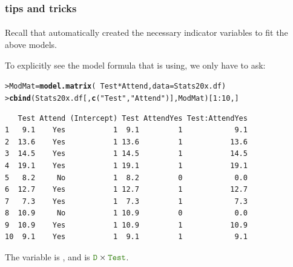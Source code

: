 \documentclass{beamer}\usepackage[]{graphicx}\usepackage[]{xcolor}
\makeatletter
\newcommand{\hlnum}[1]{\textcolor[rgb]{0.686,0.059,0.569}{#1}}%
\newcommand{\hlstr}[1]{\textcolor[rgb]{0.192,0.494,0.8}{#1}}%
\newcommand{\hlopt}[1]{\textcolor[rgb]{0,0,0}{#1}}%
\newcommand{\hlstd}[1]{\textcolor[rgb]{0.345,0.345,0.345}{#1}}%
\newcommand{\hlkwb}[1]{\textcolor[rgb]{0.69,0.353,0.396}{#1}}%
\newcommand{\hlkwc}[1]{\textcolor[rgb]{0.333,0.667,0.333}{#1}}%
\newcommand{\hlkwd}[1]{\textcolor[rgb]{0.737,0.353,0.396}{\textbf{#1}}}%
\newenvironment{kframe}{%
 \def\at@end@of@kframe{}%
 \ifinner\ifhmode%
  \def\at@end@of@kframe{\end{minipage}}%
  \begin{minipage}{\columnwidth}%
 \fi\fi%
 \def\FrameCommand##1{\hskip\@totalleftmargin \hskip-\fboxsep
 \colorbox{shadecolor}{##1}\hskip-\fboxsep
     \hskip-\linewidth \hskip-\@totalleftmargin \hskip\columnwidth}%
 \MakeFramed {\advance\hsize-\width
   \@totalleftmargin\z@ \linewidth\hsize
   \@setminipage}}%
 {\par\unskip\endMakeFramed%
 \at@end@of@kframe}
\newenvironment{knitrout}{}{} %
\makeatother
\begin{document}
\begin{frame}[fragile]
\frametitle{ tips and tricks}
\framesubtitle{}

Recall that  automatically created the necessary indicator variables to fit the above 
models.

\medskip

To explicitly see the model formula that  is using, we only have to ask:

\begin{knitrout}\scriptsize
{}\color{fgcolor}\begin{kframe}
\begin{alltt}
\hlstd{> }\hlstd{ModMat}\hlkwb{=}\hlkwd{model.matrix}\hlstd{(}\hlopt{~}\hlstd{Test}\hlopt{*}\hlstd{Attend,}\hlkwc{data}\hlstd{=Stats20x.df)}
\hlstd{> }\hlkwd{cbind}\hlstd{(Stats20x.df[,}\hlkwd{c}\hlstd{(}\hlstr{"Test"}\hlstd{,}\hlstr{"Attend"}\hlstd{)],ModMat)[}\hlnum{1}\hlopt{:}\hlnum{10}\hlstd{,]}
\end{alltt}
\begin{verbatim}
   Test Attend (Intercept) Test AttendYes Test:AttendYes
1   9.1    Yes           1  9.1         1            9.1
2  13.6    Yes           1 13.6         1           13.6
3  14.5    Yes           1 14.5         1           14.5
4  19.1    Yes           1 19.1         1           19.1
5   8.2     No           1  8.2         0            0.0
6  12.7    Yes           1 12.7         1           12.7
7   7.3    Yes           1  7.3         1            7.3
8  10.9     No           1 10.9         0            0.0
9  10.9    Yes           1 10.9         1           10.9
10  9.1    Yes           1  9.1         1            9.1
\end{verbatim}
\end{kframe}
\end{knitrout}

\medskip
The  variable is ,
and  is $\rcode{D} \times \rcode{Test}$.
\end{frame}
\end{document}
